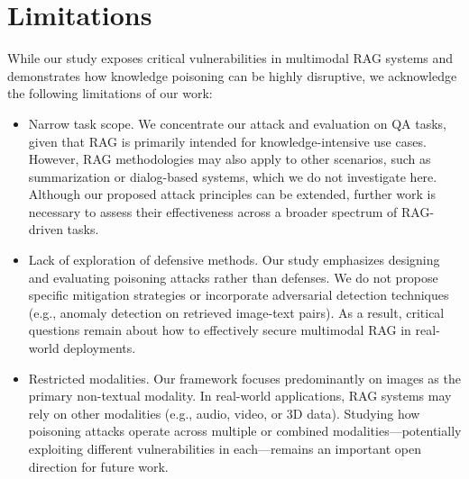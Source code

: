 \section{Limitations}

While our study exposes critical vulnerabilities in multimodal RAG systems and demonstrates how knowledge poisoning can be highly disruptive, we acknowledge the following limitations of our work:
\begin{itemize}
    \item Narrow task scope. We concentrate our attack and evaluation on QA tasks, given that RAG is primarily intended for knowledge-intensive use cases. However, RAG methodologies may also apply to other scenarios, such as summarization or dialog-based systems, which we do not investigate here. Although our proposed attack principles can be extended, further work is necessary to assess their effectiveness across a broader spectrum of RAG-driven tasks.
    \item Lack of exploration of defensive methods. Our study emphasizes designing and evaluating poisoning attacks rather than defenses. We do not propose specific mitigation strategies or incorporate adversarial detection techniques (e.g., anomaly detection on retrieved image-text pairs). As a result, critical questions remain about how to effectively secure multimodal RAG in real-world deployments.
    \item Restricted modalities. Our framework focuses predominantly on images as the primary non-textual modality. In real-world applications, RAG systems may rely on other modalities (e.g., audio, video, or 3D data). Studying how poisoning attacks operate across multiple or combined modalities—potentially exploiting different vulnerabilities in each—remains an important open direction for future work.
\end{itemize}

